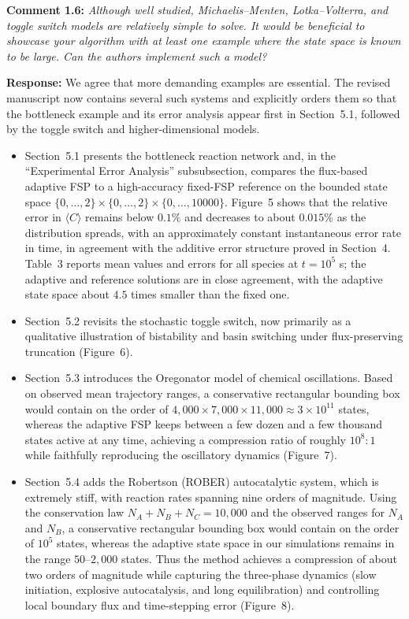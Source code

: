 \documentclass[11pt]{article}
\begin{document}
\medskip

\noindent\textbf{Comment 1.6:} \textit{Although well studied, Michaelis--Menten, Lotka--Volterra, and toggle
switch models are relatively simple to solve. It would be beneficial to showcase
your algorithm with at least one example where the state space is known to be
large. Can the authors implement such a model?}

\textbf{Response:} We agree that more demanding examples are essential. The revised
manuscript now contains several such systems and explicitly orders them so that
the bottleneck example and its error analysis appear first in Section~5.1, followed by
the toggle switch and higher-dimensional models.

\begin{itemize}
  \item Section~5.1 presents the bottleneck reaction network and, in the
        ``Experimental Error Analysis'' subsubsection, compares the flux-based
        adaptive FSP to a high-accuracy fixed-FSP reference on the bounded state
        space $\{0,\dots,2\}\times\{0,\dots,2\}\times\{0,\dots,10000\}$. Figure~5
        shows that the relative error in $\langle C\rangle$ remains below $0.1\%$
        and decreases to about $0.015\%$ as the distribution spreads, with an
        approximately constant instantaneous error rate in time, in agreement with
        the additive error structure proved in Section~4. Table~3 reports mean
        values and errors for all species at $t=10^5$ s; the adaptive and
        reference solutions are in close agreement, with the adaptive state space
        about $4.5$ times smaller than the fixed one.
  \item Section~5.2 revisits the stochastic toggle switch, now primarily as a
        qualitative illustration of bistability and basin switching under
        flux-preserving truncation (Figure~6).
  \item Section~5.3 introduces the Oregonator model of chemical oscillations.
        Based on observed mean trajectory ranges, a conservative rectangular
        bounding box would contain on the order of
        $4{,}000\times 7{,}000\times 11{,}000 \approx 3\times 10^{11}$ states,
        whereas the adaptive FSP keeps between a few dozen and a few thousand
        states active at any time, achieving a compression ratio of roughly
        $10^8{:}1$ while faithfully reproducing the oscillatory dynamics
        (Figure~7).
  \item Section~5.4 adds the Robertson (ROBER) autocatalytic system, which
        is extremely stiff, with reaction rates spanning nine orders of magnitude.
        Using the conservation law $N_A+N_B+N_C=10{,}000$ and the observed ranges
        for $N_A$ and $N_B$, a conservative rectangular bounding box would contain
        on the order of $10^5$ states, whereas the adaptive state space in our
        simulations remains in the range $50$--$2{,}000$ states. Thus the method
        achieves a compression of about two orders of magnitude while capturing
        the three-phase dynamics (slow initiation, explosive autocatalysis, and
        long equilibration) and controlling local boundary flux and time-stepping
        error (Figure~8).
\end{itemize}
\end{document}
